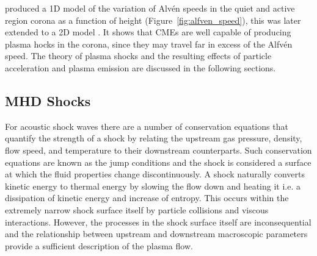 \citet{mann2003} produced a 1D model of the variation of Alv\'{e}n speeds in the quiet and active region corona as a function of height (Figure~\ref{fig:alfven_speed}), this was later extended to a 2D model \citep{warmuth2005}. It shows that CMEs are well capable of producing plasma hocks in the corona, since they may travel far in excess of the Alfv\'{e}n speed. The theory of plasma shocks and the resulting effects of particle acceleration and plasma emission are discussed in the following sections.


\subsection{MHD Shocks}\label{sec:mhd_shocks}

For acoustic shock waves there are a number of conservation equations that quantify the strength of a shock by relating the upstream gas pressure, density, flow speed, and temperature to their downstream counterparts. Such conservation equations are known as the jump conditions and the shock is considered a surface at which the fluid properties change discontinuously. A shock naturally converts kinetic energy to thermal energy by slowing the flow down and heating it i.e. a dissipation of kinetic energy and increase of entropy. This occurs within the extremely narrow shock surface itself by particle collisions and viscous interactions. However, the processes in the shock surface itself are inconsequential and the relationship between upstream and downstream macroscopic parameters provide a sufficient description of the plasma flow. 

